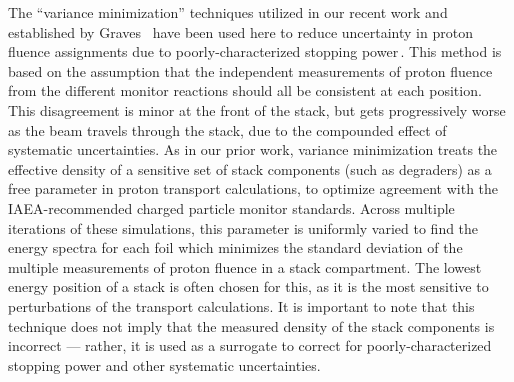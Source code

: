 The \enquote{variance minimization} techniques utilized in our recent work and established by Graves \etal\ have been used here to reduce uncertainty in proton fluence assignments due to poorly-characterized stopping power\,\cite{Voyles2018a,Graves2016}.
This method is based on the assumption that the independent measurements of proton fluence from the different monitor reactions 
should all be consistent at each 
position.
This disagreement is minor at the front of the stack, but gets progressively worse as the beam travels through the stack, due to the compounded effect of systematic uncertainties.
As in  our prior work, variance minimization treats the effective density of a sensitive set of stack components (such as degraders) as a free parameter in proton transport calculations, to optimize agreement with the IAEA-recommended charged particle monitor standards.
Across multiple iterations of these simulations, this parameter is uniformly varied to find the energy spectra for each foil which minimizes the standard deviation  of the multiple measurements of proton fluence in a stack compartment.
The lowest energy position of a stack is often chosen for this, as it is the most sensitive to perturbations of the transport calculations.
It is important to note that this technique does not imply that the measured density of the stack components is incorrect --- rather, it is used as a surrogate to correct for poorly-characterized stopping power and other systematic uncertainties.




